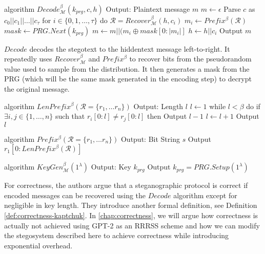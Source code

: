 \begin{Pseudocode}[float, caption={Meteor Decode Algorithm, \cite{Meteor2021}}, label={alg:decode}]
algorithm $Decode_{\mathcal{M}}^\beta(k_{prg}, c, h)$
	Output: Plaintext message $m$
	$m \leftarrow \epsilon$
	Parse $c$ as $c_0 || c_1 || \dots || c_{\tau}$
	for $i \in \{ 0, 1, \dots, \tau \}$ do
		$\mathcal{R} = Recover_{\mathcal{M}}^\beta(h, c_i)$
		$m_i \leftarrow Prefix^\beta(\mathcal{R})$
		$mask \leftarrow PRG.Next(k_{prg})$
		$m \leftarrow m || (m_i \oplus mask[0: |m_i|]$
		$h \leftarrow h||c_i$
	Output $m$
\end{Pseudocode}

$Decode$ decodes the stegotext to the hiddentext message left-to-right. 
It repeatedly uses $Recover_{\mathcal{M}}^\beta$ and $Prefix^\beta$ to recover bits from the pseudorandom value used to sample from the distribution.
It then generates a mask from the PRG (which will be the same mask generated in the encoding step) to decrypt the original message.

\begin{Pseudocode}[caption={Meteor LenPrefix Algorithm, \cite{Meteor2021}}]
algorithm $LenPrefix^\beta(\mathcal R = \{ r_1, \dots r_n \})$
	Output: Length $l$
	$l \leftarrow 1$
	while $l < \beta$ do
		if $\exists i, j \in \{ 1, \dots, n \}$ such that $r_i[0: l] \neq r_j[0:	l]$ then
			Output $l-1$
		$l \leftarrow l+1$
	Output $l$
\end{Pseudocode}%
%
\begin{Pseudocode}[caption={Meteor Prefix Algorithm, \cite{Meteor2021}}]
algorithm $Prefix^\beta(	\mathcal R = \{ r_1, \dots r_n \})$
	Output: Bit String $s$
	Output $r_1[0: LenPrefix^\beta(\mathcal{R})]$
\end{Pseudocode}%
%
\begin{Pseudocode}[caption={Meteor KeyGen Algorithm, \cite{Meteor2021}}]
algorithm $KeyGen_{\mathcal{M}}^\beta(1^\lambda)$
	Output: Key $k_{prg}$
	Output $k_{prg} = PRG.Setup(1^\lambda)$
\end{Pseudocode}

For correctness, the authors argue that a steganographic protocol is correct if encoded messages can be recovered using the $Decode$ algorithm except for negligible in key length.
They introduce another formal definition, see Definition \autoref{def:correctness-kaptchuk}.
In \autoref{chap:correctness}, we will argue how correctness is actually not achieved using GPT-2 as an RRRSS scheme and how we can modify the stegosystem described here to achieve correctness while introducing exponential overhead.

